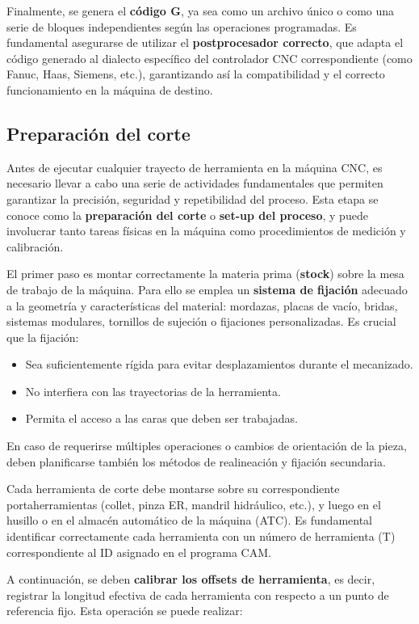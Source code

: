 Finalmente, se genera el \textbf{código G}, ya sea como un archivo único o como una serie de bloques independientes según las operaciones programadas. Es fundamental asegurarse de utilizar el \textbf{postprocesador correcto}, que adapta el código generado al dialecto específico del controlador CNC correspondiente (como Fanuc, Haas, Siemens, etc.), garantizando así la compatibilidad y el correcto funcionamiento en la máquina de destino.

\subsection{Preparación del corte}

Antes de ejecutar cualquier trayecto de herramienta en la máquina CNC, es necesario llevar a cabo una serie de actividades fundamentales que permiten garantizar la precisión, seguridad y repetibilidad del proceso. Esta etapa se conoce como la \textbf{preparación del corte} o \textbf{set-up del proceso}, y puede involucrar tanto tareas físicas en la máquina como procedimientos de medición y calibración.

El primer paso es montar correctamente la materia prima (\textbf{stock}) sobre la mesa de trabajo de la máquina. Para ello se emplea un \textbf{sistema de fijación} adecuado a la geometría y características del material: mordazas, placas de vacío, bridas, sistemas modulares, tornillos de sujeción o fijaciones personalizadas. Es crucial que la fijación:
\begin{itemize}
	\item Sea suficientemente rígida para evitar desplazamientos durante el mecanizado.
	\item No interfiera con las trayectorias de la herramienta.
	\item Permita el acceso a las caras que deben ser trabajadas.
\end{itemize}

En caso de requerirse múltiples operaciones o cambios de orientación de la pieza, deben planificarse también los métodos de realineación y fijación secundaria.

Cada herramienta de corte debe montarse sobre su correspondiente portaherramientas (collet, pinza ER, mandril hidráulico, etc.), y luego en el husillo o en el almacén automático de la máquina (ATC). Es fundamental identificar correctamente cada herramienta con un número de herramienta (T) correspondiente al ID asignado en el programa CAM.

A continuación, se deben \textbf{calibrar los offsets de herramienta}, es decir, registrar la longitud efectiva de cada herramienta con respecto a un punto de referencia fijo. Esta operación se puede realizar:

